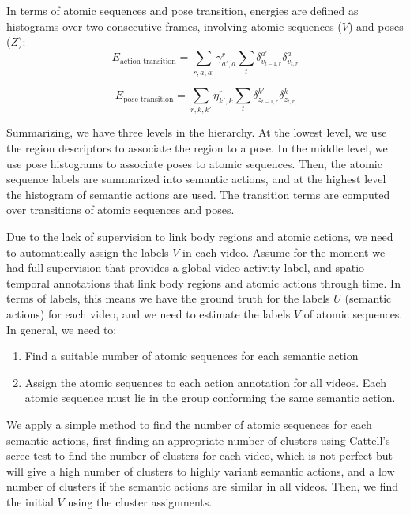 \documentclass[10pt,letterpaper]{article}
\newcommand{\+}[1]{\ensuremath{{\boldsymbol #1}}}
\begin{document}
In terms of atomic sequences and pose transition, energies are defined
as histograms over two consecutive frames,
involving atomic sequences ($V$) and poses ($Z$):
\begin{equation}
E_{\text{action transition}} = \sum_{r,a,a'}  \gamma^r_{a',a} \sum_{t} \delta_{v_{t-1,r}}^{a'}\delta_{v_{t,r}}^a 
\end{equation}

\begin{equation}
E_{\text{pose transition}} =\sum_{r,k,k'}  \eta^r_{k',k}\sum_{t}\delta_{z_{t-1,r}}^{k'}\delta_{z_{t,r}}^{k}
\end{equation}

Summarizing, we have three levels in the hierarchy. At the lowest level, we use the region descriptors to associate the region to a pose. In the middle level, we use pose histograms to associate poses to atomic sequences. Then, the atomic sequence labels are summarized into semantic actions, and at the highest level the histogram of semantic actions are used. The transition terms are computed over transitions of atomic sequences and poses. 
 \vspace{1em}

Due to the lack of supervision to link body regions and atomic actions, we need to automatically
assign the labels $V$ in each video. Assume for the moment we had full supervision that provides a global video activity label, and spatio-temporal annotations that link body regions and atomic actions through time.
In terms of labels, this means we have the ground truth for the labels $U$ (semantic actions) for each video, and we need to estimate the labels $V$ of atomic sequences.  In general, we need to:
\begin{enumerate}
\item Find a suitable number of atomic sequences for each semantic action
\item Assign the atomic sequences to each action annotation for all videos. Each atomic sequence must lie in the group conforming the same semantic action.
\end{enumerate}

We apply a simple method to find the number of atomic sequences for each semantic actions, first finding an appropriate number of clusters using Cattell's scree test to find the number of clusters for each video, which is not perfect but will give a high number of clusters to highly variant semantic actions, and a low number of clusters if the semantic actions are similar in all videos. Then, we find the initial $V$ using the cluster assignments. 
\end{document}
